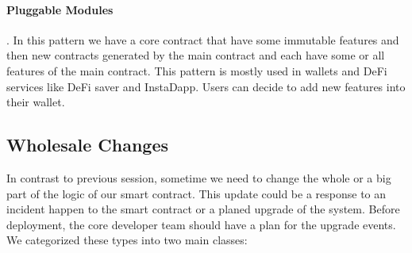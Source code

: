 \paragraph{Pluggable Modules}. In this pattern we have a core contract that have some immutable features and then new contracts generated by the main contract and each have some or all features of the main contract. This pattern is mostly used in wallets and DeFi services like DeFi saver and InstaDapp. Users can decide to add new features into their wallet. 

\subsection{Wholesale Changes}
In contrast to previous session, sometime we need to change the whole or a big part of the logic of our smart contract. This update could be a response to an incident happen to the smart contract or a planed upgrade of the system. Before deployment, the core developer team should have a plan for the upgrade events. We categorized these types into two main classes:

